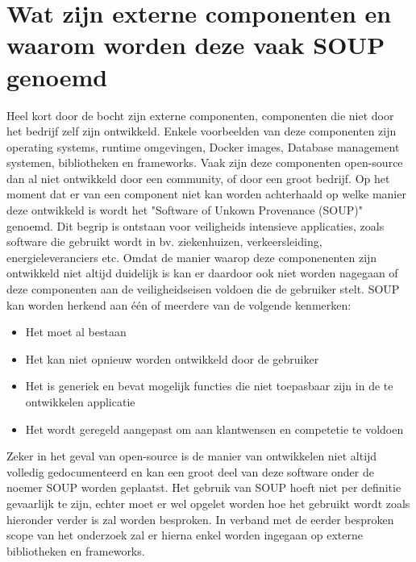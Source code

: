 \section{Wat zijn externe componenten en waarom worden deze vaak SOUP genoemd}\label{sec:watisSOUP}
Heel kort door de bocht zijn externe componenten, componenten die niet door het bedrijf zelf zijn ontwikkeld. Enkele voorbeelden van deze componenten zijn operating systems, runtime omgevingen, Docker images, Database management systemen, bibliotheken en frameworks. Vaak zijn deze componenten open-source dan al niet ontwikkeld door een community, of door een groot bedrijf. Op het moment dat er van een component niet kan worden achterhaald op welke manier deze ontwikkeld is wordt het "Software of Unkown Provenance (SOUP)" genoemd. Dit begrip is ontstaan voor veiligheids intensieve applicaties, zoals software die gebruikt wordt in bv. ziekenhuizen, verkeersleiding, energieleveranciers etc. Omdat de manier waarop deze componenenten zijn ontwikkeld niet altijd duidelijk is kan er daardoor ook niet worden nagegaan of deze componenten aan de veiligheidseisen voldoen die de gebruiker stelt. SOUP kan worden herkend aan één of meerdere van de volgende kenmerken:
\begin{itemize}
    \item Het moet al bestaan
    \item Het kan niet opnieuw worden ontwikkeld door de gebruiker
    \item Het is generiek en bevat mogelijk functies die niet toepasbaar zijn in de te ontwikkelen applicatie
    \item Het wordt geregeld aangepast om aan klantwensen en competetie te voldoen
\end{itemize}
\citep{Bishop:2001}

Zeker in het geval van open-source is de manier van ontwikkelen niet altijd volledig gedocumenteerd en kan een groot deel van deze software onder de noemer SOUP worden geplaatst. Het gebruik van SOUP hoeft niet per definitie gevaarlijk te zijn, echter moet er wel opgelet worden hoe het gebruikt wordt zoals hieronder verder is zal worden besproken. In verband met de eerder besproken scope van het onderzoek zal er hierna enkel worden ingegaan op externe bibliotheken en frameworks.


